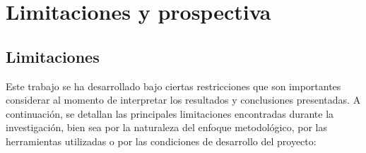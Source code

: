 \chapter{Limitaciones y prospectiva}




\section{Limitaciones}

Este trabajo se ha desarrollado bajo ciertas restricciones que son importantes considerar al momento de interpretar los resultados y conclusiones presentadas. A continuación, se detallan las principales limitaciones encontradas durante la investigación, bien sea por la naturaleza del enfoque metodológico, por las herramientas utilizadas o por las condiciones de desarrollo del proyecto:

